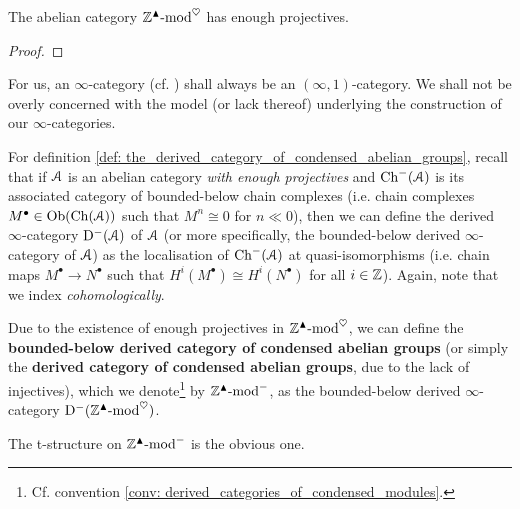             \begin{theorem} \label{theorem: the_large_category_of_condensed_abelian_groups_has_enough_projectives}
                The abelian category $\mathbb{Z}^{\blacktriangle}\text{-}\mathrm{mod}^{\heartsuit}$ has enough projectives.
            \end{theorem}
                \begin{proof}
                    
                \end{proof}
            \begin{convention}
                For us, an $\infty$-category (cf. \cite[Chapters 1-3]{HTT}) shall always be an $(\infty, 1)$-category. We shall not be overly concerned with the model (or lack thereof) underlying the construction of our $\infty$-categories. 
            \end{convention}
            \begin{remark}
                For definition \ref{def: the_derived_category_of_condensed_abelian_groups}, recall that if $\mathcal{A}$ is an abelian category \textit{with enough projectives} and $\mathrm{Ch}^-(\mathcal{A})$ is its associated category of bounded-below chain complexes (i.e. chain complexes $M^{\bullet} \in \mathrm{Ob}(\mathrm{Ch}(\mathcal{A}))$ such that $M^n \cong 0$ for $n \ll 0$), then we can define the derived $\infty$-category $\mathrm{D}^-(\mathcal{A})$ of $\mathcal{A}$ (or more specifically, the bounded-below derived $\infty$-category of $\mathcal{A}$) as the localisation of $\mathrm{Ch}^-(\mathcal{A})$ at quasi-isomorphisms (i.e. chain maps $M^{\bullet} \to N^{\bullet}$ such that $H^i(M^{\bullet}) \cong H^i(N^{\bullet})$ for all $i \in \mathbb{Z}$). Again, note that we index \textit{cohomologically}. 
            \end{remark}
            \begin{definition} \label{def: the_derived_category_of_condensed_abelian_groups}
                Due to the existence of enough projectives in $\mathbb{Z}^{\blacktriangle}\text{-}\mathrm{mod}^{\heartsuit}$, we can define the \textbf{bounded-below derived category of condensed abelian groups} (or simply the \textbf{derived category of condensed abelian groups}, due to the lack of injectives), which we denote\footnote{Cf. convention \ref{conv: derived_categories_of_condensed_modules}.} by $\mathbb{Z}^{\blacktriangle}\text{-}\mathrm{mod}^-$, as the bounded-below derived $\infty$-category $\mathrm{D}^-(\mathbb{Z}^{\blacktriangle}\text{-}\mathrm{mod}^{\heartsuit})$.
                
                The t-structure on $\mathbb{Z}^{\blacktriangle}\text{-}\mathrm{mod}^-$ is the obvious one.
            \end{definition}
